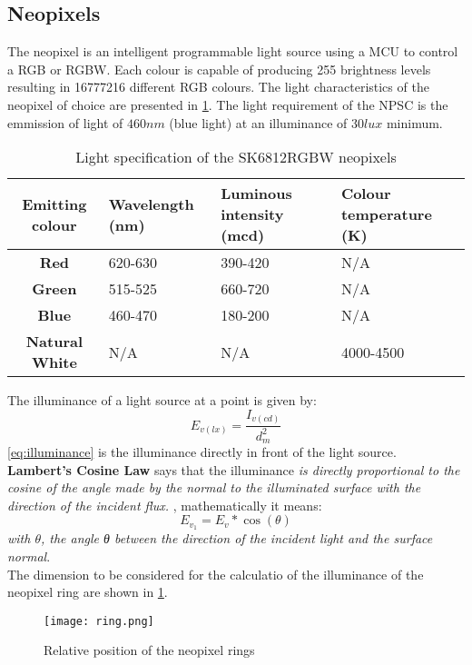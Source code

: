 \subsection{Neopixels}
The neopixel is an intelligent programmable light source using a MCU to control a RGB or RGBW. Each colour is capable of producing 255 brightness levels resulting in 16777216 different RGB colours. 
The light characteristics of the neopixel of choice are presented in \cref{table:neopixel_specs}. The light requirement of the NPSC is the emmission of light of $460nm$ (blue light) at an illuminance of $30lux$ minimum.
\begin{table}[h!]
\centering
\begin{tabular}{cp{6em}p{6em}p{6em}}
\hline
\hline
\textbf{Emitting colour} & \textbf{Wavelength (nm)} & \textbf{Luminous intensity (mcd)} & \textbf{Colour temperature (K)} \\ 
\hline
\textbf{Red} & 620-630 & 390-420 & N/A\\
\textbf{Green} & 515-525 & 660-720 & N/A  \\
\textbf{Blue} & 460-470 & 180-200 & N/A\\
\textbf{Natural White} & N/A & N/A & 4000-4500\\
\hline
\hline
\end{tabular}
\caption{Light specification of the SK6812RGBW neopixels}
\label{table:neopixel_specs}
\end{table}
The illuminance of a light source at a point is given by: 
\begin{equation}\label{eq:illuminance}
E_{v(lx)}=\frac{I_{v(cd)}}{d_m^2}
\end{equation}
\cref{eq:illuminance} is the illuminance directly in front of the light source. \textbf{Lambert's Cosine Law} says that the illuminance \textit{is directly proportional to the cosine of the angle made by the normal to the illuminated surface with the direction of the incident flux.} \cite{optical}, mathematically it means:
\begin{equation}\label{eq:lambert}
E_{v_1}=E_v*\cos(\theta)
\end{equation}
\textit{with $\theta$, the angle θ between the direction of the incident light and the surface normal}.\\
The dimension to be considered for the calculatio of the illuminance of the neopixel ring are shown in \cref{fig:neopixel_ring_dimension}.
\begin{figure}[h!]
\centering
\texttt{[image: ring.png]}
\caption{Relative position of the neopixel rings}
\label{fig:neopixel_ring_dimension}
\end{figure}
